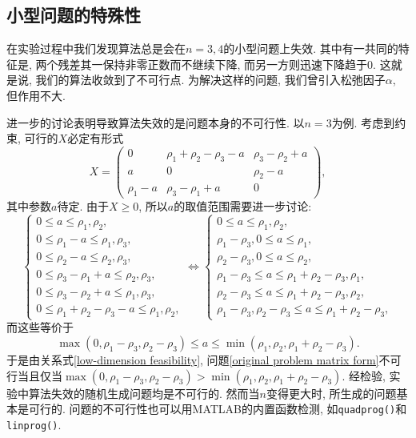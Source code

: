 \subsection{小型问题的特殊性}
在实验过程中我们发现算法总是会在$n=3,4$的小型问题上失效. 其中有一共同的特征是, 两个残差其一保持非零正数而不继续下降, 而另一方则迅速下降趋于0. 这就是说, 我们的算法收敛到了不可行点. 为解决这样的问题, 我们曾引入松弛因子$\alpha$, 但作用不大. 
\par 进一步的讨论表明导致算法失效的是问题本身的不可行性. 以$n=3$为例. 考虑到约束, 可行的$X$必定有形式
$$X=\begin{pmatrix}
	0 & \rho_1+\rho_2-\rho_3-a & \rho_3-\rho_2+a\\
	a & 0 & \rho_2-a\\
	\rho_1-a & \rho_3-\rho_1+a & 0
\end{pmatrix},$$
其中参数$a$待定. 由于$X\ge0$, 所以$a$的取值范围需要进一步讨论:
$$\left\{\begin{array}{l}
	0\le a\le\rho_1,\rho_2,\\
	0\le\rho_1-a\le\rho_1,\rho_3,\\
	0\le\rho_2-a\le\rho_2,\rho_3,\\
	0\le\rho_3-\rho_1+a\le\rho_2,\rho_3,\\
	0\le\rho_3-\rho_2+a\le\rho_1,\rho_3,\\
	0\le\rho_1+\rho_2-\rho_3-a\le\rho_1,\rho_2,
\end{array}\right.\Leftrightarrow
\left\{\begin{array}{l}
	0\le a\le\rho_1,\rho_2,\\
	\rho_1-\rho_3,0\le a\le\rho_1,\\
	\rho_2-\rho_3,0\le a\le\rho_2,\\
	\rho_1-\rho_3\le a\le\rho_1+\rho_2-\rho_3,\rho_1,\\
	\rho_2-\rho_3\le a\le\rho_1+\rho_2-\rho_3,\rho_2,\\
	\rho_1-\rho_3,\rho_2-\rho_3\le a\le\rho_1+\rho_2-\rho_3,
\end{array}\right.$$
而这些等价于
\begin{equation}
	\max(0,\rho_1-\rho_3,\rho_2-\rho_3)\le a\le\min(\rho_1,\rho_2,\rho_1+\rho_2-\rho_3).
	\label{low-dimension feasibility}
\end{equation}
于是由关系式\eqref{low-dimension feasibility}, 问题\eqref{original problem matrix form}不可行当且仅当$\max(0,\rho_1-\rho_3,\rho_2-\rho_3)>\min(\rho_1,\rho_2,\rho_1+\rho_2-\rho_3)$. 经检验, 实验中算法失效的随机生成问题均是不可行的. 然而当$n$变得更大时, 所生成的问题基本是可行的. 问题的不可行性也可以用MATLAB的内置函数检测, 如\texttt{quadprog()}和\texttt{linprog()}.

